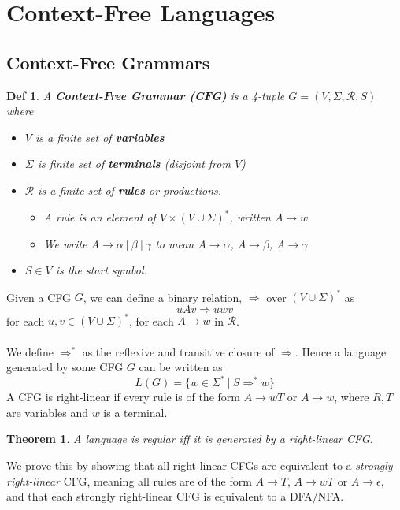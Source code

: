\documentclass{article}
\newtheorem{thm}{Theorem}
\newtheorem{defn}[dummy]{Def}
\begin{document}
\section{Context-Free Languages}
    \subsection{Context-Free Grammars}
    \begin{defn}
        A \textbf{Context-Free Grammar (CFG)} is a 4-tuple $G = (V,\Sigma,\mathcal{R},S)$ where
        \begin{itemize}
            \item $V$ is a finite set of \textbf{variables}
            \item $\Sigma$ is finite set of \textbf{terminals} (disjoint from $V$)
            \item $\mathcal{R}$ is a finite set of \textbf{rules} or productions. 
            \begin{itemize}
                \item A rule is an element of $V \times (V \cup \Sigma)^*$, written $A \to w$
                \item We write $A \to \alpha \ | \ \beta \ | \ \gamma$ to mean $A \to \alpha$, $A \to \beta$, $A \to \gamma$
            \end{itemize}
            \item $S \in V$ is the start symbol. 
        \end{itemize}
    \end{defn}
    Given a CFG $G$, we can define a binary relation, $\Rightarrow$ over $(V \cup \Sigma)^*$ as
    \[ uAv \Rightarrow uwv \]
    for each $u,v \in (V \cup \Sigma)^*$, for each $A \to w$ in $\mathcal{R}$. \\ \\
    We define $\Rightarrow^*$ as the reflexive and transitive closure of $\Rightarrow$. Hence a language generated by some CFG $G$ can be written as 
    \[ L(G) = \{ w \in \Sigma^* \ | \ S  \Rightarrow^* w\} \]
    A CFG is right-linear if every rule is of the form $A \to wT$ or $A \to w$, where $R,T$ are variables and $w$ is a terminal. 
    \begin{thm}
        A language is regular iff it is generated by a right-linear CFG. 
    \end{thm}
    We prove this by showing that all right-linear CFGs are equivalent to a \textit{strongly right-linear} CFG, meaning all rules are of the form $A \to T$, $A \to wT$ or $A \to \epsilon$, and that each strongly right-linear CFG is equivalent to a DFA/NFA. 
\end{document}
